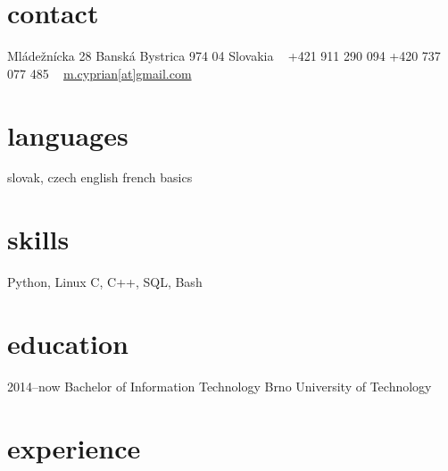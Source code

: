 \documentclass[]{friggeri-cv} %
\begin{document}


\begin{aside} %
\section{contact}
Mládežnícka 28
Banská Bystrica 974 04
Slovakia
~
+421 911 290 094
+420 737 077 485
~
\href{mailto:m.cyprian@gmail.com}{m.cyprian[at]gmail.com}
\section{languages}
slovak, czech
english
french basics
\section{skills}
Python, Linux
C, C++, SQL, Bash
\end{aside}


\section{education}

\begin{entrylist}


\entry
{2014--now}
{Bachelor {\normalfont of Information Technology}}
{Brno University of Technology}



\end{entrylist}


\section{experience}
\end{document}
